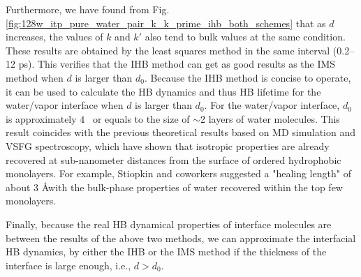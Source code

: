 Furthermore, we have found from Fig.\thinspace\ref{fig:128w_itp_pure_water_pair_k_k_prime_ihb_both_schemes} that as $d$ increases, 
the values of $k$ and $k'$ also tend to bulk values at the same condition.
These results are obtained by the least squares method in the same interval (0.2--12 ps). This verifies that the IHB method 
can get as good results as the IMS method when $d$ is larger than $d_0$. 
Because the IHB method is concise to operate, it can be used to calculate the HB dynamics and thus HB lifetime for the water/vapor interface 
when $d$ is larger than $d_0$. For the water/vapor interface, $d_0$ is approximately $4$ \A \ or equals to the size of $\sim$2 layers of water molecules. 
This result coincides with the previous theoretical results based on MD simulation\cite{Townsend1985,Taylor1996,Morita2000} 
and VSFG spectroscopy\cite{Stiopkin2011,Tyrode2013}, which have shown that isotropic properties are already recovered 
at sub-nanometer distances from the surface of ordered hydrophobic monolayers.
For example, Stiopkin and coworkers suggested a "healing length" of about 3 \AA with the bulk-phase properties of water recovered within the top few monolayers\cite{Stiopkin2011}.

Finally, because the real HB dynamical properties of interface molecules are between the results of the above two methods, 
we can approximate the interfacial HB dynamics, by either the IHB or the IMS method if the thickness of the interface is large enough, i.e., $d>d_0$.



